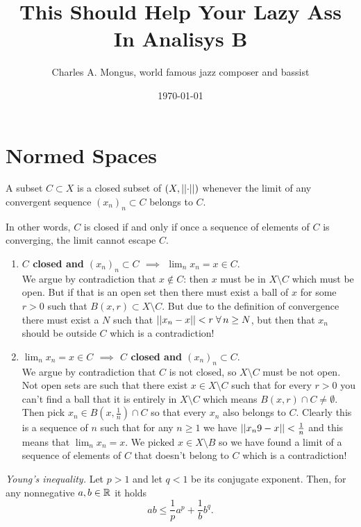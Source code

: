 \documentclass{article}
\title{This Should Help Your Lazy Ass In Analisys B}
\author{Charles A. Mongus, world famous jazz composer and bassist}
\date{\today}
\begin{document}
\maketitle
\tableofcontents
\section{Normed Spaces}
\begin{proposition}
    A subset $C\subset X$ is a closed subset of $(X,\left|\left|\cdot\right|\right|)$ whenever the limit of any convergent sequence ${(x_n)}_n\subset C$ belongs to $C$. 
\end{proposition}
In other words, $C$ is closed if and only if once a sequence of elements of $C$ is converging, the limit cannot escape $C$.
\begin{fancyproof}
    \begin{enumerate}[\circnum]
        \item \textbf{$C$ closed and ${(x_n)}_n\subset C$ $\implies$ $\lim_nx_n=x\in C$}.\\
        We argue by contradiction that $x\not\in C$: then $x$ must be in $X\setminus C$ which must be open. But if that is an open set then there must exist a ball of $x$ for some $r>0$ such that $B(x,r)\subset X\setminus C$. But due to the definition of convergence there must exist a $N$ such that $\left|\left|x_n-x\right|\right|<r\;\forall\, n\geq N$, but then that $x_n$ should be outside $C$ which is a contradiction!
        \item \textbf{$\lim_nx_n=x\in C$ $\implies$ $C$ closed  and ${(x_n)}_n\subset C$}. \\
        We argue by contradiction that $C$ is not closed, so $X\setminus C$ must be not open. Not open sets are such that there exist $x\in X\setminus C$ such that for every $r>0$ you can't find a ball that it is entirely in $X\setminus C$ which means $B(x,r)\cap C\neq\emptyset$. Then pick $x_n\in B(x,\frac{1}{n})\cap C$ so that every $x_n$ also belongs to $C$. Clearly this is a sequence of $n$ such that for any $n\geq1$ we have $\left|\left|x_n9-x\right|\right|<\frac{1}{n}$ and this means that $\lim_nx_n=x$. We picked $x\in X\setminus B$ so we have found a limit of a sequence of elements of $C$ that doesn't belong to $C$ which is a contradiction!
    \end{enumerate}
\end{fancyproof}
\begin{lemma}
		\emph{Young's inequality.} Let $p>1$ and let $q<1$ be its conjugate exponent. Then, for any nonnegative $a,b\in\mathbb{R}$ it holds
		\begin{equation*}
			ab\leq\frac{1}{p}a^{p}+\frac{1}{b}b^q.
		\end{equation*}
\end{lemma}
\end{document}
